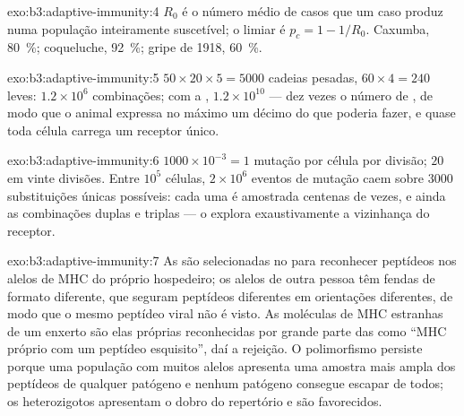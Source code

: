 \begin{solution}{exo:b3:adaptive-immunity:4}
$R_{0}$ é o número médio de casos que um caso produz numa população
inteiramente suscetível; o limiar é $p_{c} = 1 - 1/R_{0}$. Caxumba,
\qty{80}{\%}; coqueluche, \qty{92}{\%}; gripe de 1918, \qty{60}{\%}.
\end{solution}

\begin{solution}{exo:b3:adaptive-immunity:5}
$50\times 20\times 5 = 5000$ cadeias pesadas, $60\times 4 = 240$ leves:
$1.2\times 10^{6}$ combinações; com a , $1.2\times
10^{10}$ --- dez vezes o número de , de modo que o animal
expressa no máximo um décimo do que poderia fazer, e quase toda célula
carrega um receptor único.
\end{solution}

\begin{solution}{exo:b3:adaptive-immunity:6}
$1000\times 10^{-3} = 1$ mutação por célula por divisão; $20$ em vinte
divisões. Entre $10^{5}$ células, $2\times 10^{6}$ eventos de mutação
caem sobre $3000$ substituições únicas possíveis: cada uma é amostrada
centenas de vezes, e ainda as combinações duplas e triplas --- o  explora exaustivamente a vizinhança do receptor.
\end{solution}

\begin{solution}{exo:b3:adaptive-immunity:7}
As  são selecionadas no  para reconhecer peptídeos nos
alelos de MHC do próprio hospedeiro; os alelos de outra pessoa têm
fendas de formato diferente, que seguram peptídeos diferentes em
orientações diferentes, de modo que o mesmo peptídeo viral não é visto.
As moléculas de MHC estranhas de um enxerto são elas próprias
reconhecidas por grande parte das  como ``MHC próprio com um
peptídeo esquisito'', daí a rejeição. O polimorfismo persiste porque uma
população com muitos alelos apresenta uma amostra mais ampla dos
peptídeos de qualquer patógeno e nenhum patógeno consegue escapar de
todos; os heterozigotos apresentam o dobro do repertório e são
favorecidos.
\end{solution}

